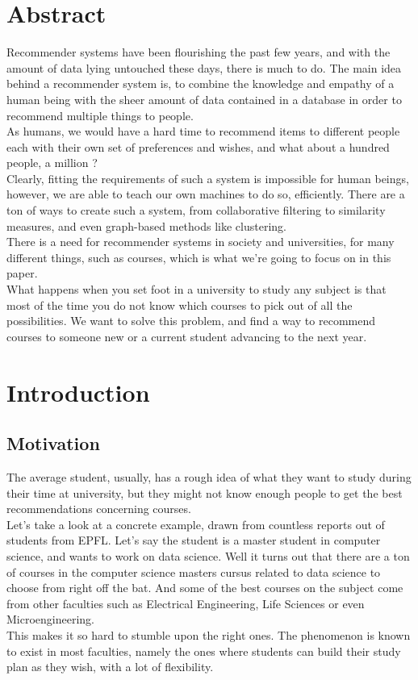 \documentclass{article}
\begin{document}
\section{Abstract}
    Recommender systems have been flourishing the past few years, and with the amount of data lying untouched these days, there is much to do. The main idea behind a recommender system is, to combine the knowledge and empathy of a human being with the sheer amount of data contained in a database in order to recommend multiple things to people.
    \\As humans, we would have a hard time to recommend items to different people each with their own set of preferences and wishes, and what about a hundred people, a million ?
    \\Clearly, fitting the requirements of such a system is impossible for human beings, however, we are able to teach our own machines to do so, efficiently. There are a ton of ways to create such a system, from collaborative filtering to similarity measures, and even graph-based methods like clustering.
    \\There is a need for recommender systems in society and universities, for many different things, such as courses, which is what we're going to focus on in this paper.
    \\What happens when you set foot in a university to study any subject is that most of the time you do not know which courses to pick out of all the possibilities. We want to solve this problem, and find a way to recommend courses to someone new or a current student advancing to the next year.

\newpage
\section{Introduction}
    \subsection{Motivation}
        The average student, usually, has a rough idea of what they want to study during their time at university, but they might not know enough people to get the best recommendations concerning courses.
        \\Let's take a look at a concrete example, drawn from countless reports out of students from EPFL. Let's say the student is a master student in computer science, and wants to work on data science. Well it turns out that there are a ton of courses in the computer science masters cursus related to data science to choose from right off the bat. And some of the best courses on the subject come from other faculties such as Electrical Engineering, Life Sciences or even Microengineering.
        \\This makes it so hard to stumble upon the right ones. The phenomenon is known to exist in most faculties, namely the ones where students can build their study plan as they wish, with a lot of flexibility.
\end{document}
